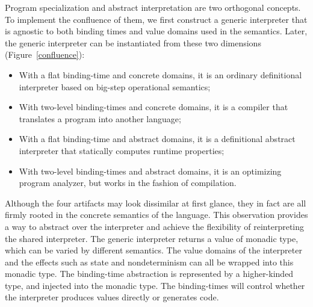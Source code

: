 Program specialization and abstract interpretation are two orthogonal
concepts.  To implement the confluence of them, we first construct a
generic interpreter that is agnostic to both binding times and value
domains used in the semantics.  Later, the generic interpreter can be
instantiated from these two dimensions (Figure~\ref{confluence}):
\begin{itemize}
\item With a flat binding-time and concrete domains, it is an ordinary
  definitional interpreter based on big-step operational semantics;
\item With two-level binding-times and concrete domains, it is a
  compiler that translates a program into another language;
\item With a flat binding-time and abstract domains, it is a
  definitional abstract interpreter \cite{DBLP:journals/pacmpl/DaraisLNH17}
  that statically computes runtime properties;
\item With two-level binding-times and abstract domains, it is an optimizing
  program analyzer, but works in the fashion of compilation.
\end{itemize}

Although the four artifacts may look dissimilar at first glance, they in
fact are all firmly rooted in the concrete semantics of the language.  This
observation provides a way to abstract over the interpreter and achieve the
flexibility of reinterpreting the shared interpreter.  The generic interpreter
returns a value of monadic type, which can be varied by different semantics.
The value domains of the interpreter and the effects such as state and nondeterminism
can all be wrapped into this monadic type.  The binding-time abstraction is
represented by a higher-kinded type, and injected into the monadic type.  The
binding-times will control whether the interpreter produces values directly or
generates code. 


